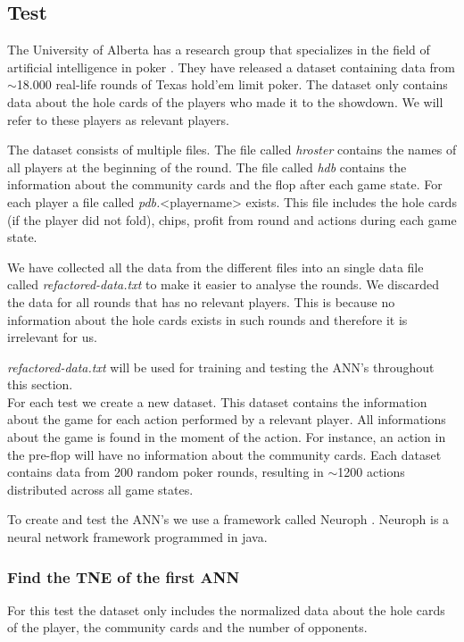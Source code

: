 \subsection{Test}
\label{sec:default-test}
The University of Alberta has a research group that specializes in the field of artificial intelligence in poker \cite{alberta}. They have released a dataset containing data from $\sim$18.000 real-life rounds of Texas hold'em limit poker. The dataset only contains data about the hole cards of the players who made it to the showdown. We will refer to these players as relevant players.

The dataset consists of multiple files. The file called \textit{hroster} contains the names of all players at the beginning of the round. The file called \textit{hdb} contains the information about the community cards and the flop after each game state. For each player a file called \textit{pdb.}<playername> exists. This file includes the hole cards (if the player did not fold), chips, profit from round and actions during each game state. 

We have collected all the data from the different files into an single data file called \textit{refactored-data.txt} to make it easier to analyse the rounds. We discarded the data for all rounds that has no relevant players. This is because no information about the hole cards exists in such rounds and therefore it is irrelevant for us. 

\textit{refactored-data.txt} will be used for training and testing the ANN's throughout this section.\\

For each test we create a new dataset. This dataset contains the information about the game for each action performed by a relevant player. All informations about the game is found in the moment of the action. For instance, an action in the pre-flop will have no information about the community cards.
Each dataset contains data from 200 random poker rounds, resulting in $\sim$1200 actions distributed across all game states.

To create and test the ANN's we use a framework called Neuroph \cite{neuroph}. Neuroph is a neural network framework programmed in java. 

\subsubsection{Find the TNE of the first ANN}
\label{sec:ann-test1}
For this test the dataset only includes the normalized data about the hole cards of the player, the community cards and the number of opponents.

